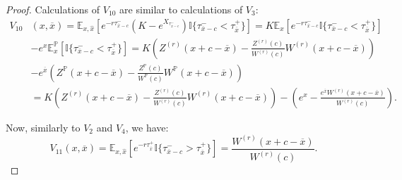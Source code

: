 \documentclass[10pt,a4paper]{amsart}
\def\E{{\mathbb{E}}}
\def\Eq{{\mathbb{E}
		_{x,\hat{x}}}}
\def\P{{\mathbb{P}}}
\def \R{{{\rm I{\!}\rm R}}}
\def \I{{\mathbb{I}}}
\def\P{{\mathbb P}} \def\le{\left} \def\ri{\right} \def\i{\infty}
\def\E{{\mathbb E}} \def\PP{\mc P} \def\Z{{\mathbb Z}} \def\R{{\mathbb R}}
\begin{document}
\begin{proof}
			Calculations of $V_{10}$ are similar to calculations of $V_3$:
			\begin{align}
				\nonumber V_{10}&(x,\overline{x}) = \Eq\left[ e^{-r\tau_{\overline{x}-c}^-} \left( K - e^{X_{\tau_{\overline{x}-c}^-}} \right) \I
				\{ \tau_{\overline{x}-c}^- < \tau_{\overline{x}}^+ \} \right] = K\E_x\left[ e^{-r\tau_{\overline{x}-c}^-} \I
				\{ \tau_{\overline{x}-c}^- < \tau_{\overline{x}}^+ \} \right] \\
				\nonumber &  - e^x \E^\P_x\left[  \I
				\{ \tau_{\overline{x}-c}^- < \tau_{\overline{x}}^+ \} \right] =  K\left( Z^{(r)}(x+c-\overline{x}) - \frac{Z^{(r)}(c)}{W^{(r)}(c)}W^{(r)}(x+c-\overline{x}) \right) \\
				\nonumber &  -e^{\overline{x}}\left( Z^{\P}(x+c-\overline{x}) - \frac{Z^{\P}(c)}{W^{\P}(c)}W^{\P}(x+c-\overline{x}) \right) \\
				& = K\left( Z^{(r)}(x+c-\overline{x}) - \frac{Z^{(r)}(c)}{W^{(r)}(c)}W^{(r)}(x+c-\overline{x}) \right) - \left( e^x - \frac{e^{\overline{x}}W^{(r)}(x+c-\overline{x})}{W^{(r)}(c)} \right). \label{V10}
			\end{align}
			
			Now, similarly to $V_2$ and $V_4$, we have:
			\begin{equation}\label{V11}
				V_{11}(x, \overline{x}) = \Eq\left[ e^{-r\tau_{\overline{x}}^+} \I
				\{ \tau_{\overline{x}-c}^- > \tau_{\overline{x}}^+ \} \right] = \frac{W^{(r)}(x+c-\overline{x})}{W^{(r)}(c)}.
			\end{equation}
			

\end{proof}
\end{document}
